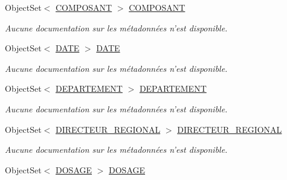 \begin{DoxyCompactItemize}
Object\-Set$<$ \hyperlink{class_model_1_1_c_o_m_p_o_s_a_n_t}{C\-O\-M\-P\-O\-S\-A\-N\-T} $>$ \hyperlink{class_model_1_1_b_d_d___s_i_o7_entities_a5ef1a59c0bb85f597274b5c08a6cf511}{C\-O\-M\-P\-O\-S\-A\-N\-T}
\begin{DoxyCompactList}\small\item\em Aucune documentation sur les métadonnées n'est disponible. \end{DoxyCompactList}\item 
Object\-Set$<$ \hyperlink{class_model_1_1_d_a_t_e}{D\-A\-T\-E} $>$ \hyperlink{class_model_1_1_b_d_d___s_i_o7_entities_ab13a7822afc52c06d029c60e43d291cf}{D\-A\-T\-E}
\begin{DoxyCompactList}\small\item\em Aucune documentation sur les métadonnées n'est disponible. \end{DoxyCompactList}\item 
Object\-Set$<$ \hyperlink{class_model_1_1_d_e_p_a_r_t_e_m_e_n_t}{D\-E\-P\-A\-R\-T\-E\-M\-E\-N\-T} $>$ \hyperlink{class_model_1_1_b_d_d___s_i_o7_entities_a4bade7b78d4a579cdd6690d69ba0c131}{D\-E\-P\-A\-R\-T\-E\-M\-E\-N\-T}
\begin{DoxyCompactList}\small\item\em Aucune documentation sur les métadonnées n'est disponible. \end{DoxyCompactList}\item 
Object\-Set$<$ \hyperlink{class_model_1_1_d_i_r_e_c_t_e_u_r___r_e_g_i_o_n_a_l}{D\-I\-R\-E\-C\-T\-E\-U\-R\-\_\-\-R\-E\-G\-I\-O\-N\-A\-L} $>$ \hyperlink{class_model_1_1_b_d_d___s_i_o7_entities_a57e9f9cd0a56bd3698866941b6e2dbb3}{D\-I\-R\-E\-C\-T\-E\-U\-R\-\_\-\-R\-E\-G\-I\-O\-N\-A\-L}
\begin{DoxyCompactList}\small\item\em Aucune documentation sur les métadonnées n'est disponible. \end{DoxyCompactList}\item 
Object\-Set$<$ \hyperlink{class_model_1_1_d_o_s_a_g_e}{D\-O\-S\-A\-G\-E} $>$ \hyperlink{class_model_1_1_b_d_d___s_i_o7_entities_ac901579b6afd772748e68adb8bd2e0f7}{D\-O\-S\-A\-G\-E}

\end{DoxyCompactItemize}
